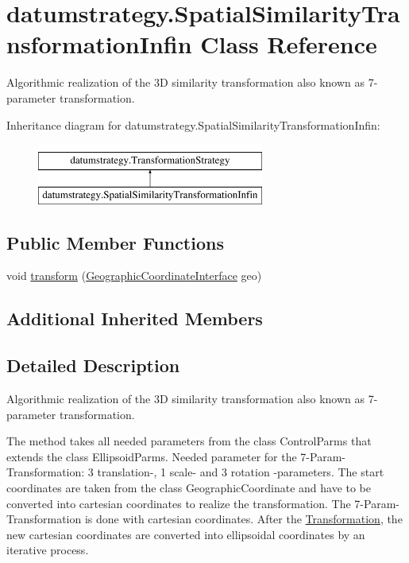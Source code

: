 \hypertarget{classdatumstrategy_1_1_spatial_similarity_transformation_infin}{}\section{datumstrategy.\+Spatial\+Similarity\+Transformation\+Infin Class Reference}
\label{classdatumstrategy_1_1_spatial_similarity_transformation_infin}


Algorithmic realization of the 3D similarity transformation also known as 7-\/parameter transformation.  


Inheritance diagram for datumstrategy.\+Spatial\+Similarity\+Transformation\+Infin\+:\begin{figure}[H]
\begin{center}
\leavevmode
\includegraphics[height=2.000000cm]{classdatumstrategy_1_1_spatial_similarity_transformation_infin}
\end{center}
\end{figure}
\subsection*{Public Member Functions}
\begin{DoxyCompactItemize}
\item 
void \hyperlink{classdatumstrategy_1_1_spatial_similarity_transformation_infin_a10a133bbcba0dec7e7bdff6a430087b5}{transform} (\hyperlink{classcoordinates_1_1_geographic_coordinate_interface}{Geographic\+Coordinate\+Interface} geo)
\end{DoxyCompactItemize}
\subsection*{Additional Inherited Members}


\subsection{Detailed Description}
Algorithmic realization of the 3D similarity transformation also known as 7-\/parameter transformation. 

The method takes all needed parameters from the class Control\+Parms that extends the class Ellipsoid\+Parms. Needed parameter for the 7-\/\+Param-\/\+Transformation\+: 3 translation-\/, 1 scale-\/ and 3 rotation -\/parameters. The start coordinates are taken from the class Geographic\+Coordinate and have to be converted into cartesian coordinates to realize the transformation. The 7-\/\+Param-\/\+Transformation is done with cartesian coordinates. After the \hyperlink{class_transformation}{Transformation}, the new cartesian coordinates are converted into ellipsoidal coordinates by an iterative process.

